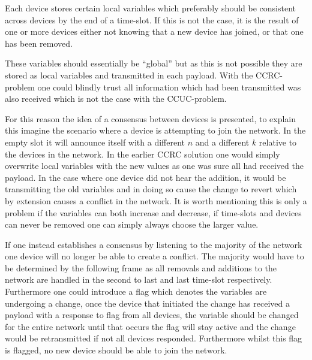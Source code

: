 Each device stores certain local variables which preferably should be consistent across devices by the end of a time-slot.
If this is not the case, it is the result of one or more devices either not knowing that a new device has joined, or that one has been removed.

These variables should essentially be ``global'' but as this is not possible they are stored as local variables and transmitted in each payload.
With the CCRC-problem one could blindly trust all information which had been transmitted was also received which is not the case with the CCUC-problem.

\bigskip \noindent
For this reason the idea of a consensus between devices is presented, to explain this imagine the scenario where a device is attempting to join the network.
In the empty slot it will announce itself with a different $n$ and a different $k$ relative to the devices in the network.
In the earlier CCRC solution one would simply overwrite local variables with the new values as one was sure all had received the payload.
In the case where one device did not hear the addition, it would be transmitting the old variables and in doing so cause the change to revert which by extension causes a conflict in the network.
It is worth mentioning this is only a problem if the variables can both increase and decrease, if time-slots and devices can never be removed one can simply always choose the larger value.

If one instead establishes a consensus by listening to the majority of the network one device will no longer be able to create a conflict.
The majority would have to be determined by the following frame as all removals and additions to the network are handled in the second to last and last time-slot respectively.
Furthermore one could introduce a flag which denotes the variables are undergoing a change, once the device that initiated the change has received a payload with a response to flag from all devices, the variable should be changed for the entire network until that occurs the flag will stay active and the change would be retransmitted if not all devices responded.
Furthermore whilst this flag is flagged, no new device should be able to join the network.